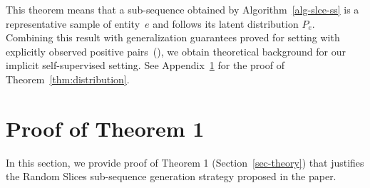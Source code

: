 \documentclass[sigconf, anonymous]{acmart}
\newtheorem{thm}{Theorem}
\renewcommand{\P}{\mathbb{P}}
\begin{document}
This theorem means that a sub-sequence obtained by Algorithm~\ref{alg-slce-ss} is a representative sample of entity~$e$ and follows its latent distribution $P_e$. Combining this result with generalization guarantees proved for setting with explicitly observed positive pairs~(\cite{Saunshi2019ICML}), we obtain theoretical background for our implicit self-supervised setting.   
See Appendix~\ref{app-sec-proof} for the proof of Theorem~\ref{thm:distribution}.

\section{Proof of Theorem 1} \label{app-sec-proof}

In this section, we provide proof of Theorem 1 (Section~\ref{sec-theory}) that justifies the Random Slices sub-sequence generation strategy proposed in the paper.


\end{document}
